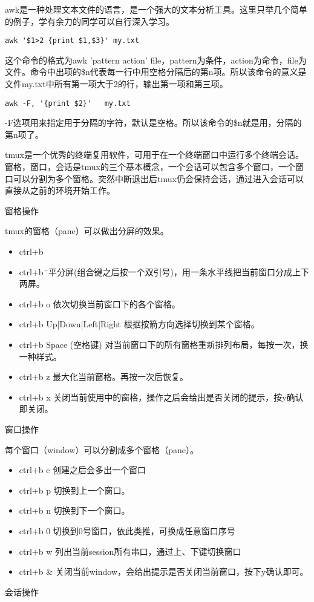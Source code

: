 awk是一种处理文本文件的语言，是一个强大的文本分析工具。这里只举几个简单的例子，学有余力的同学可以自行深入学习。
\begin{verbatim}
awk '$1>2 {print $1,$3}' my.txt
\end{verbatim}
这个命令的格式为awk 'pattern action' file，pattern为条件，action为命令，file为文件。命令中出项的\$n代表每一行中用空格分隔后的第n项。所以该命令的意义是文件my.txt中所有第一项大于2的行，输出第一项和第三项。
\begin{verbatim}
awk -F, '{print $2}'   my.txt
\end{verbatim}
-F选项用来指定用于分隔的字符，默认是空格。所以该命令的\$n就是用，分隔的第n项了。

tmux是一个优秀的终端复用软件，可用于在一个终端窗口中运行多个终端会话。窗格，窗口，会话是tmux的三个基本概念，一个会话可以包含多个窗口，一个窗口可以分割为多个窗格。突然中断退出后tmux仍会保持会话，通过进入会话可以直接从之前的环境开始工作。

窗格操作

tmux的窗格（pane）可以做出分屏的效果。
\begin{itemize}
\item ctrl+b %
\item ctrl+b \" 水平分屏(组合键之后按一个双引号)，用一条水平线把当前窗口分成上下两屏。
\item ctrl+b o 依次切换当前窗口下的各个窗格。
\item ctrl+b Up|Down|Left|Right 根据按箭方向选择切换到某个窗格。
\item ctrl+b Space (空格键) 对当前窗口下的所有窗格重新排列布局，每按一次，换一种样式。
\item ctrl+b z 最大化当前窗格。再按一次后恢复。
\item ctrl+b x 关闭当前使用中的窗格，操作之后会给出是否关闭的提示，按y确认即关闭。
\end{itemize}


窗口操作

每个窗口（window）可以分割成多个窗格（pane）。
\begin{itemize}
\item ctrl+b c 创建之后会多出一个窗口
\item ctrl+b p 切换到上一个窗口。
\item ctrl+b n 切换到下一个窗口。
\item ctrl+b 0 切换到0号窗口，依此类推，可换成任意窗口序号
\item ctrl+b w 列出当前session所有串口，通过上、下键切换窗口
\item ctrl+b \& 关闭当前window，会给出提示是否关闭当前窗口，按下y确认即可。
\end{itemize}
会话操作

